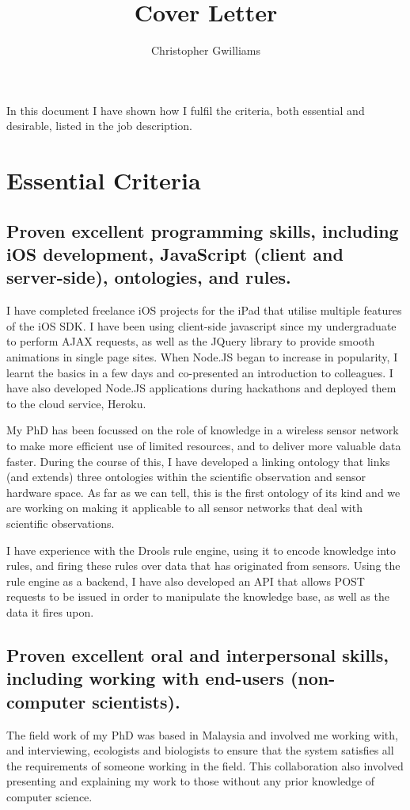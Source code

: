 \documentclass[10pt,a4paper]{article}
\author{Christopher Gwilliams}
\title{Cover Letter}
\begin{document}
\maketitle
In this document I have shown how I fulfil the criteria, both essential and desirable, listed in the job description.

\section{Essential Criteria}
\subsection{Proven excellent programming skills, including iOS development, JavaScript (client and server-side), ontologies, and rules.}
I have completed freelance iOS projects for the iPad that utilise multiple features of the iOS SDK. I have been using client-side javascript since my undergraduate to perform AJAX requests, as well as the JQuery library to provide smooth animations in single page sites. When Node.JS began to increase in popularity, I learnt the basics in a few days and co-presented an introduction to colleagues. I have also developed Node.JS applications during hackathons and deployed them to the cloud service, Heroku. 

My PhD has been focussed on the role of knowledge in a wireless sensor network to make more efficient use of limited resources, and to deliver more valuable data faster. During the course of this, I have developed a linking ontology that links (and extends) three ontologies within the scientific observation and sensor hardware space. As far as we can tell, this is the first ontology of its kind and we are working on making it applicable to all sensor networks that deal with scientific observations.

I have experience with the Drools rule engine, using it to encode knowledge into rules, and firing these rules over data that has originated from sensors. Using the rule engine as a backend, I have also developed an API that allows POST requests to be issued in order to manipulate the knowledge base, as well as the data it fires upon.

\subsection{Proven excellent oral and interpersonal skills, including working with end-users (non-computer scientists).}
The field work of my PhD was based in Malaysia and involved me working with, and interviewing, ecologists and biologists to ensure that the system satisfies all the requirements of someone working in the field. This collaboration also involved presenting and explaining my work to those without any prior knowledge of computer science.
\end{document}
